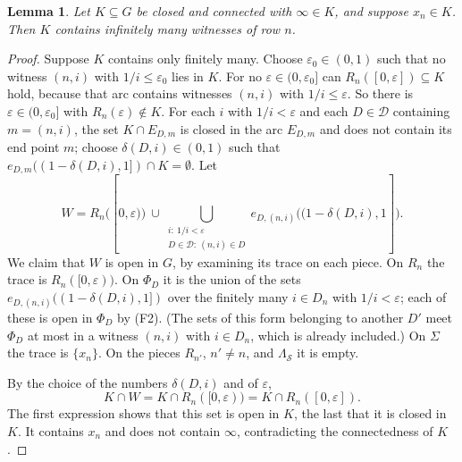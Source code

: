 \documentclass[11pt]{amsart}
\newtheorem{lemma}[theorem]{Lemma}
\theoremstyle{definition}
\theoremstyle{remark}
\newcommand{\cD}{\mathcal{D}}
\newcommand{\cS}{\mathcal{S}}
\numberwithin{equation}{section}
\begin{document}
\begin{lemma}\label{lem:cut}
Let $K\subseteq G$ be closed and connected with $\infty\in K$, and suppose $x_n\in K$. Then $K$ contains infinitely many witnesses of row $n$.
\end{lemma}
\begin{proof}
Suppose $K$ contains only finitely many. Choose $\varepsilon_0\in(0,1)$ such that no witness $(n,i)$ with $1/i\le\varepsilon_0$ lies in $K$. For no $\varepsilon\in(0,\varepsilon_0]$ can $R_n([0,\varepsilon])\subseteq K$ hold, because that arc contains witnesses $(n,i)$ with $1/i\le\varepsilon$. So there is $\varepsilon\in(0,\varepsilon_0]$ with $R_n(\varepsilon)\notin K$. For each $i$ with $1/i<\varepsilon$ and each $D\in\cD$ containing $m=(n,i)$, the set $K\cap E_{D,m}$ is closed in the arc $E_{D,m}$ and does not contain its end point $m$; choose $\delta(D,i)\in(0,1)$ such that $e_{D,m}((1-\delta(D,i),1])\cap K=\emptyset$. Let
\[W=R_n([0,\varepsilon))\ \cup\bigcup_{\substack{i:\ 1/i<\varepsilon\\ D\in\cD:\ (n,i)\in D}}e_{D,(n,i)}\bigl((1-\delta(D,i),1]\bigr).\]
We claim that $W$ is open in $G$, by examining its trace on each piece. On $R_n$ the trace is $R_n([0,\varepsilon))$. On $\Phi_D$ it is the union of the sets $e_{D,(n,i)}((1-\delta(D,i),1])$ over the finitely many $i\in D_n$ with $1/i<\varepsilon$; each of these is open in $\Phi_D$ by (F2). (The sets of this form belonging to another $D'$ meet $\Phi_D$ at most in a witness $(n,i)$ with $i\in D_n$, which is already included.) On $\Sigma$ the trace is $\{x_n\}$. On the pieces $R_{n'}$, $n'\ne n$, and $\Lambda_\cS$ it is empty.

By the choice of the numbers $\delta(D,i)$ and of $\varepsilon$,
\[K\cap W=K\cap R_n([0,\varepsilon))=K\cap R_n([0,\varepsilon]).\]
The first expression shows that this set is open in $K$, the last that it is closed in $K$. It contains $x_n$ and does not contain $\infty$, contradicting the connectedness of $K$.
\end{proof}
\end{document}

